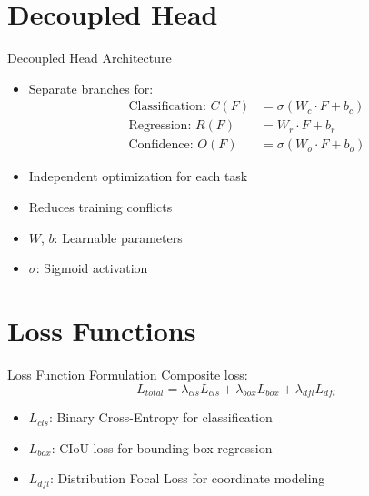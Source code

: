 \documentclass{beamer}
\begin{document}
\section{Decoupled Head}
\begin{frame}{Decoupled Head Architecture}
    \begin{itemize}
        \item Separate branches for:
            \begin{align}
            \text{Classification: }C(F) &= \sigma(W_c \cdot F + b_c) \\
            \text{Regression: }R(F) &= W_r \cdot F + b_r \\
            \text{Confidence: }O(F) &= \sigma(W_o \cdot F + b_o)
            \end{align}
        \item Independent optimization for each task
        \item Reduces training conflicts
        \item $W$, $b$: Learnable parameters
        \item $\sigma$: Sigmoid activation
    \end{itemize}
\end{frame}

\section{Loss Functions}
\begin{frame}{Loss Function Formulation}
    Composite loss:
    \begin{equation}
    L_{total} = \lambda_{cls}L_{cls} + \lambda_{box}L_{box} + \lambda_{dfl}L_{dfl}
    \end{equation}

    \begin{itemize}
        \item $L_{cls}$: Binary Cross-Entropy for classification
        \item $L_{box}$: CIoU loss for bounding box regression
        \item $L_{dfl}$: Distribution Focal Loss for coordinate modeling
    \end{itemize}
\end{frame}
\end{document}

